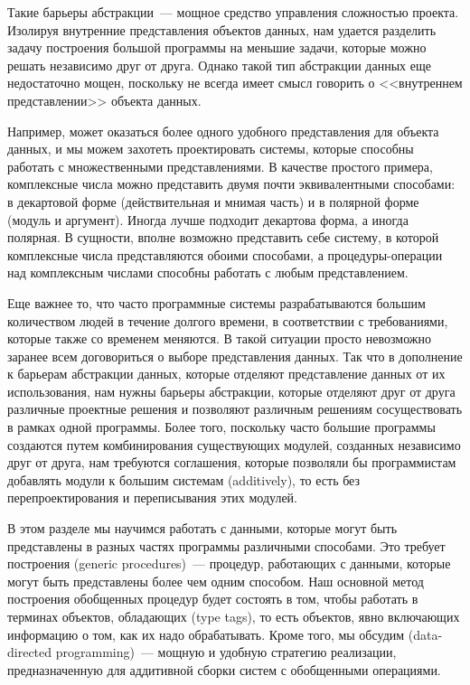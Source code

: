 Такие барьеры абстракции~--- мощное средство управления
сложностью проекта.  Изолируя внутренние представления объектов
данных, нам удается разделить задачу построения большой программы на
меньшие задачи, которые можно решать независимо друг от друга.
Однако такой тип абстракции данных еще недостаточно мощен, поскольку
не всегда имеет смысл говорить о <<внутреннем представлении>>
объекта данных.

Например, может оказаться более одного удобного
представления для объекта данных, и мы можем захотеть проектировать
системы, которые способны работать с множественными представлениями.
В качестве простого примера, комплексные числа можно представить двумя 
почти эквивалентными способами: в декартовой форме (действительная и
мнимая часть) и в полярной форме (модуль и аргумент).  Иногда лучше
подходит декартова форма, а иногда полярная.  В сущности, вполне
возможно представить себе систему, в которой комплексные числа
представляются обоими способами, а процедуры-операции над комплексным 
числами способны работать с любым представлением.

Еще важнее то, что часто программные системы разрабатываются
большим количеством людей в течение долгого времени, в соответствии с
требованиями, которые также со временем меняются.  В такой ситуации
просто невозможно заранее всем договориться о выборе представления
данных.  Так что в дополнение к барьерам абстракции данных, которые
отделяют представление данных от их использования, нам нужны барьеры
абстракции, которые отделяют друг от друга различные проектные решения 
и позволяют различным решениям сосуществовать в рамках одной
программы.  Более того, поскольку часто большие программы создаются
путем комбинирования существующих модулей, созданных независимо друг
от друга, нам требуются соглашения, которые позволяли бы программистам 
добавлять модули к большим системам  (additively), то есть без перепроектирования и 
переписывания этих модулей.

В этом разделе мы научимся работать с данными,
которые могут быть представлены в разных частях программы различными
способами.  Это требует построения   
 (generic procedures)~--- процедур, работающих с данными,
которые могут быть представлены более чем одним способом.  Наш
основной метод построения обобщенных процедур будет состоять в том, чтобы 
работать в терминах объектов, обладающих 
 (type tags), то есть объектов, явно включающих
информацию о том, как их надо обрабатывать.  Кроме того, мы обсудим
 (data-directed programming)~--- мощную и удобную стратегию реализации,
предназначенную для аддитивной сборки систем с обобщенными
операциями.

